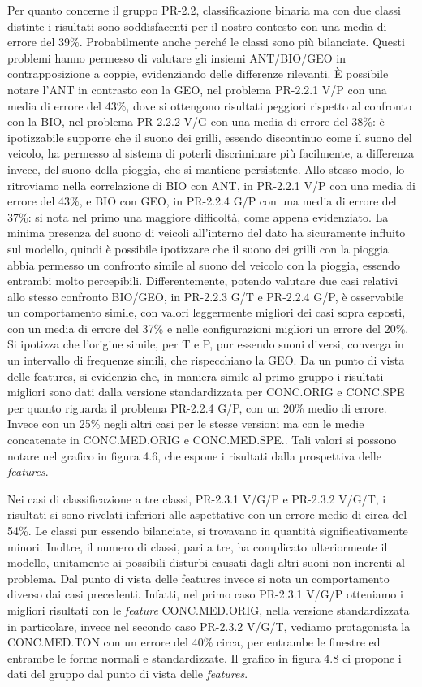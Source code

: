 Per quanto concerne il gruppo PR-2.2, classificazione binaria ma con due classi distinte i
risultati sono soddisfacenti per il nostro contesto con una media di errore del 39\%.
Probabilmente anche perché le classi sono più bilanciate. Questi problemi hanno permesso di
valutare gli insiemi ANT/BIO/GEO in contrapposizione a coppie, evidenziando delle
differenze rilevanti. È possibile notare l’ANT in contrasto con la GEO, nel problema
PR-2.2.1 V/P con una media di errore del 43\%, dove si ottengono risultati peggiori rispetto al
confronto con la BIO, nel problema PR-2.2.2 V/G con una media di errore del 38\%: è
ipotizzabile supporre che il suono dei grilli, essendo discontinuo come il suono del veicolo,
ha permesso al sistema di poterli discriminare più facilmente, a differenza invece, del suono
della pioggia, che si mantiene persistente. Allo stesso modo, lo ritroviamo nella correlazione
di BIO con ANT, in PR-2.2.1 V/P con una media di errore del 43\%, e BIO con GEO, in
PR-2.2.4 G/P con una media di errore del 37\%: si nota nel primo una maggiore difficoltà,
come appena evidenziato. La minima presenza del suono di veicoli all’interno del dato ha
sicuramente influito sul modello, quindi è possibile ipotizzare che il suono dei grilli con la
pioggia abbia permesso un confronto simile al suono del veicolo con la pioggia, essendo
entrambi molto percepibili. Differentemente, potendo valutare due casi relativi allo stesso
confronto BIO/GEO, in PR-2.2.3 G/T e PR-2.2.4 G/P, è osservabile un comportamento
simile, con valori leggermente migliori dei casi sopra esposti, con un media di errore del 37\%
e nelle configurazioni migliori un errore del 20\%. Si ipotizza che l’origine simile, per T e P,
pur essendo suoni diversi, converga in un intervallo di frequenze simili, che rispecchiano la
GEO. Da un punto di vista delle features, si evidenzia che, in maniera simile al primo gruppo
i risultati migliori sono dati dalla versione standardizzata per CONC.ORIG e CONC.SPE per
quanto riguarda il problema PR-2.2.4 G/P, con un 20\% medio di errore. Invece con un 25\%
negli altri casi per le stesse versioni ma con le medie concatenate in CONC.MED.ORIG e
CONC.MED.SPE.. Tali valori si possono notare nel grafico in figura 4.6, che espone i risultati dalla
prospettiva delle \textit{features}.

Nei casi di classificazione a tre classi, PR-2.3.1 V/G/P e PR-2.3.2 V/G/T, i risultati si sono
rivelati inferiori alle aspettative con un errore medio di circa del 54\%. Le classi pur essendo
bilanciate, si trovavano in quantità significativamente minori. Inoltre, il numero di classi, pari
a tre, ha complicato ulteriormente il modello, unitamente ai possibili disturbi causati dagli
altri suoni non inerenti al problema. Dal punto di vista delle features invece si nota un
comportamento diverso dai casi precedenti. Infatti, nel primo caso PR-2.3.1 V/G/P otteniamo
i migliori risultati con le \textit{feature} CONC.MED.ORIG, nella versione standardizzata in
particolare, invece nel secondo caso PR-2.3.2 V/G/T, vediamo protagonista la CONC.MED.TON 
con un errore del 40\% circa, per entrambe le finestre ed entrambe le forme
normali e standardizzate. Il grafico in figura 4.8 ci propone i dati del gruppo dal punto di vista delle
\textit{features}.


